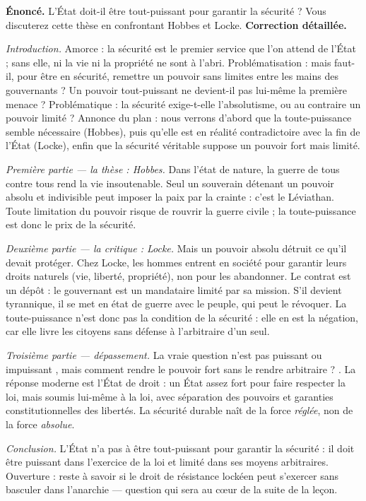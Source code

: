 \documentclass[11pt]{article}
\begin{document}
\begin{exoresolu}
\textbf{Énoncé.} L'État doit-il être tout-puissant pour garantir la sécurité ? Vous discuterez cette thèse en confrontant Hobbes et Locke.
\tcblower
\textbf{Correction détaillée.}

\emph{Introduction.} Amorce : la sécurité est le premier service que l'on attend de l'État ; sans elle, ni la vie ni la propriété ne sont à l'abri. Problématisation : mais faut-il, pour être en sécurité, remettre un pouvoir sans limites entre les mains des gouvernants ? Un pouvoir tout-puissant ne devient-il pas lui-même la première menace ? Problématique : la sécurité exige-t-elle l'absolutisme, ou au contraire un pouvoir limité ? Annonce du plan : nous verrons d'abord que la toute-puissance semble nécessaire (Hobbes), puis qu'elle est en réalité contradictoire avec la fin de l'État (Locke), enfin que la sécurité véritable suppose un pouvoir fort mais limité.

\emph{Première partie --- la thèse : Hobbes.} Dans l'état de nature, la guerre de tous contre tous rend la vie insoutenable. Seul un souverain détenant un pouvoir absolu et indivisible peut imposer la paix par la crainte : c'est le Léviathan. Toute limitation du pouvoir risque de rouvrir la guerre civile ; la toute-puissance est donc le prix de la sécurité.

\emph{Deuxième partie --- la critique : Locke.} Mais un pouvoir absolu détruit ce qu'il devait protéger. Chez Locke, les hommes entrent en société pour garantir leurs droits naturels (vie, liberté, propriété), non pour les abandonner. Le contrat est un dépôt : le gouvernant est un mandataire limité par sa mission. S'il devient tyrannique, il se met en état de guerre avec le peuple, qui peut le révoquer. La toute-puissance n'est donc pas la condition de la sécurité : elle en est la négation, car elle livre les citoyens sans défense à l'arbitraire d'un seul.

\emph{Troisième partie --- dépassement.} La vraie question n'est pas \guillemotleft puissant ou impuissant \guillemotright, mais \guillemotleft comment rendre le pouvoir fort sans le rendre arbitraire ? \guillemotright. La réponse moderne est l'État de droit : un État assez fort pour faire respecter la loi, mais soumis lui-même à la loi, avec séparation des pouvoirs et garanties constitutionnelles des libertés. La sécurité durable naît de la force \emph{réglée}, non de la force \emph{absolue}.

\emph{Conclusion.} L'État n'a pas à être tout-puissant pour garantir la sécurité : il doit être puissant dans l'exercice de la loi et limité dans ses moyens arbitraires. Ouverture : reste à savoir si le droit de résistance lockéen peut s'exercer sans basculer dans l'anarchie --- question qui sera au cœur de la suite de la leçon.
\end{exoresolu}
\end{document}
